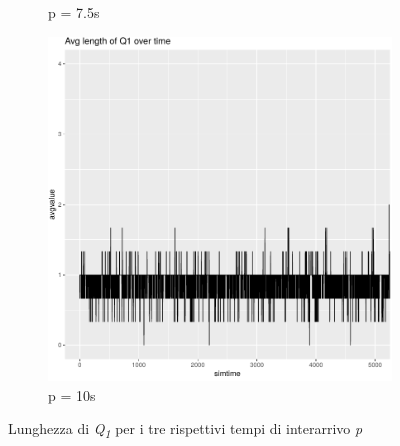 \documentclass[a4paper,11pt]{article}
\begin{document}
\begin{figure}[h!]
\begin{subfigure}[t]{.5\textwidth}
      \caption{p = 7.5s}
      \label{fig:sfig2}
    \end{subfigure}
    \begin{subfigure}[t]{\textwidth}
      \centering
      \includegraphics[width=.45\linewidth]{images/chart-q1avglength-10.png}
      \caption{p = 10s}
      \label{fig:sfig2}
    \end{subfigure}
    \caption{Lunghezza di \textit{Q\textsubscript{1}} per i tre rispettivi tempi di interarrivo \textit{p}}
    \label{fig:fig}
\end{figure}
\newpage
\end{document}
